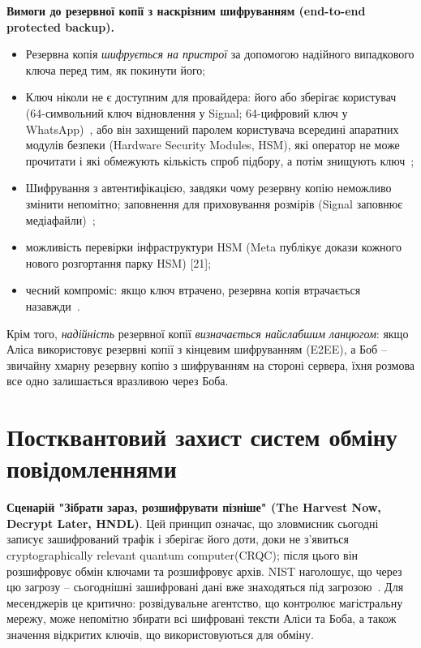 \textbf{Вимоги до резервної копії з наскрізним шифруванням (end-to-end protected backup).}
\begin{itemize}[noitemsep]
    \item Резервна копія \emph{шифрується на пристрої} за допомогою надійного випадкового ключа перед тим, 
        як покинути його;
    \item Ключ ніколи не є доступним для провайдера: його або зберігає користувач (64-символьний ключ відновлення 
        у Signal; 64-цифровий ключ у WhatsApp)~\cite{signal_secure_backups, whatsapp_e2ee_backups}, або він захищений 
        паролем користувача всередині апаратних модулів безпеки (Hardware Security Modules, HSM), які оператор не 
        може прочитати і які обмежують кількість спроб підбору, а потім знищують ключ~\cite{whatsapp_e2ee_backups, meta_backups_2026};
    \item Шифрування з автентифікацією, завдяки чому резервну копію неможливо змінити непомітно; заповнення
        для приховування розмірів (Signal заповнює медіафайли)~\cite{signal_secure_backups};
    \item можливість перевірки інфраструктури HSM (Meta публікує докази кожного нового розгортання парку HSM) [21];
    \item чесний компроміс: якщо ключ втрачено, резервна копія втрачається назавжди~\cite{signal_secure_backups}.
\end{itemize}
Крім того, \emph{надійність} резервної копії \emph{визначається найслабшим ланцюгом}: якщо Аліса використовує резервні 
копії з кінцевим шифруванням (E2EE), а Боб -- звичайну хмарну резервну копію з шифруванням на стороні
сервера, їхня розмова все одно залишається вразливою через Боба.

\section{Постквантовий захист систем обміну повідомленнями}
\label{sec:pq}

\textbf{Сценарій "Зібрати зараз, розшифрувати пізніше"{} (The Harvest Now, Decrypt Later, HNDL)}. Цей принцип 
означає, що зловмисник сьогодні записує зашифрований трафік і зберігає його доти, доки не з’явиться cryptographically 
relevant quantum computer(CRQC); після цього він розшифровує обмін ключами та розшифровує архів. NIST наголошує, 
що через цю загрозу -- сьогоднішні зашифровані дані вже знаходяться під загрозою~\cite{nist_ir8547}. Для месенджерів 
це критично: розвідувальне агентство, що контролює магістральну мережу, може непомітно збирати всі шифровані тексти 
Аліси та Боба, а також значення відкритих ключів, що використовуються для обміну.

